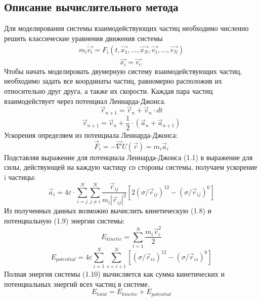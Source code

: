 \documentclass[14pt,a4paper,report]{ncc}
\begin{document}
\subsection{Описание вычислительного метода}
Для моделирования системы взаимодействующих частиц необходимо численно решить классические уравнения движения системы
\begin{equation}
m_{i}\dot{\vec{v_i}}=F_{i}(t, \vec{x_1}, ... ,  \vec{x_N}, \vec{v_1}, ... , \vec{v_N})
\end{equation}
\begin{equation}
\dot{\vec{x_i}}=\vec{v_i}.
\end{equation}
Чтобы начать моделировать двумерную систему взаимодействующих частиц, необходимо задать все координаты частиц, равномерно расположив их относительно друг друга, а также их скорости. Каждая пара частиц взаимодействует через потенциал Леннарда-Джонса.
\begin{equation}
\vec{r}_{n+1} = \vec{r}_{n} + \vec{v}_{n}\cdot{dt}
\end{equation}
\begin{equation}
\vec{v}_{n+1}=\vec{v}_{n}+\frac{1}{2} \cdot (\vec{a}_n+\vec{a}_{n+1})
\end{equation}
Ускорения определяем из потенциала Леннарда-Джонса:
\begin{equation}
\vec{F}_i= -\vec{\nabla}U(\vec{r}) = m_i \vec{a}_i
\end{equation}
Подставляя выражение для потенциала Леннарда-Джонса (1.1) в выражение для силы, действующей на каждую частицу со стороны системы, получаем ускорение i частицы:
\begin{equation}
\vec{a}_i=4  \varepsilon \cdot  \sum\limits_{i=j}^N \sum\limits_{j \neq i}^N{\frac{\vec{r}_{ij}}{m_i | \vec{r}_{ij}|^2}  [2  (\sigma/\vec{r}_{ij})^{12}-(\sigma/\vec{r}_{ij})^6]}
\end{equation}
Из полученных данных возможно вычислить кинетическую (1.8) и потенциальную (1.9) энергии системы:
\begin{equation}
E_{kinetic} = \sum\limits_{i=1}^N{\frac{m_i {\vec{v}}^2_i}{2}}
\end{equation}
\begin{equation}
E_{potential}=4 \varepsilon \sum\limits_{i=1}^N \sum\limits_{s=i+1}^N{ [(\sigma/\vec{r}_{is})^{12} - (\sigma/\vec{r}_{is})^{6}  ]}
\end{equation}
Полная энергия системы (1.10) вычисляется как сумма кинетических и потенциальных энергий всех частиц в системе.
\begin{equation}
E_{total}=E_{kinetic}+E_{potential}
\end{equation}
\end{document}
